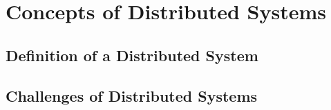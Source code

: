 \section{Concepts of Distributed Systems}

\subsection{Definition of a Distributed System}

\subsection{Challenges of Distributed Systems}
